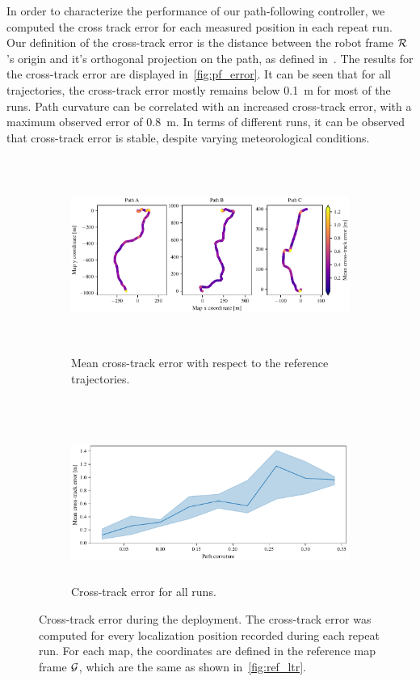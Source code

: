 In order to characterize the performance of our path-following controller, we computed the cross track error for each measured position in each repeat run.
Our definition of the cross-track error is the distance between the robot frame $\mathcal{R}$'s origin and it's orthogonal projection on the path, as defined in~\citep{Mondoloni2005}.
The results for the cross-track error are displayed in~\autoref{fig:pf_error}.
It can be seen that for all trajectories, the cross-track error mostly remains below \SI{0.1}{m} for most of the runs.
Path curvature can be correlated with an increased cross-track error, with a maximum observed error of \SI{0.8}{m}.
In terms of different runs, it can be observed that cross-track error is stable, despite varying meteorological conditions. 

\begin{figure}[htpb]
	\begin{center}
		\begin{subfigure}[b]{\textwidth}
			\centering
			\includegraphics[height=2.5in]{figs/ref_traj_errors.pdf}
			\caption{Mean cross-track error with respect to the reference trajectories.}
			\label{fig:pf_error_traj}
		\end{subfigure}
		\\
		\begin{subfigure}[b]{\textwidth}
			\centering
			\includegraphics[height=2.0in]{figs/cur_vs_crosstrack.pdf}
			\caption{Cross-track error for all runs.}
			\label{fig:pf_error_runs}
		\end{subfigure}
		\caption{Cross-track error during the deployment.
		The cross-track error was computed for every localization position recorded during each repeat run.
		For each map, the coordinates are defined in the reference map frame $\mathcal{G}$, which are the same as shown in~\autoref{fig:ref_ltr}.} 
		\label{fig:pf_error}
	\end{center}
\end{figure}



